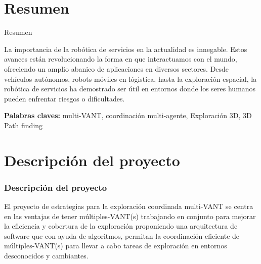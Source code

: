 \documentclass[
	11pt, %
]{beamer}
\begin{document}


\section{Resumen}

\begin{frame}
  
  \begin{block}{Resumen}

    La importancia de la robótica de servicios en la actualidad es innegable. Estos avances están revolucionando la forma en que interactuamos con el mundo, ofreciendo un amplio abanico de aplicaciones en diversos sectores. Desde vehículos autónomos, robots móviles en lógistica, hasta la exploración espacial, la robótica de servicios ha demostrado ser útil en entornos donde los seres humanos pueden enfrentar riesgos o dificultades.\\
  

  \medskip 
  
  \noindent \textbf{Palabras claves:} multi-VANT, coordinación multi-agente, Exploración 3D, 3D Path finding
  
  \end{block}
  
\end{frame}

\section{Descripción del proyecto}

\begin{frame}
  \frametitle{Descripción del proyecto}

  El proyecto de estrategias para la exploración coordinada multi-VANT se centra en las ventajas de tener múltiples-VANT(s) trabajando en conjunto para mejorar la eficiencia y cobertura de la exploración proponiendo una arquitectura de software que con ayuda de algoritmos, permitan la coordinación eficiente de múltiples-VANT(s) para llevar a cabo tareas de exploración en entornos desconocidos y cambiantes.
      
\end{frame}
\end{document}
